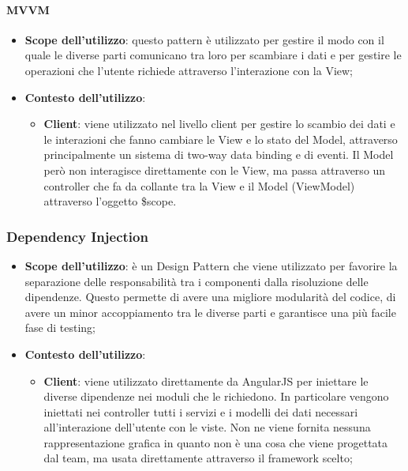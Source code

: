 		\paragraph{MVVM} %
		\label{par:mvvm}
			\begin{itemize}
				\item \textbf{Scope dell'utilizzo}: questo pattern è utilizzato per gestire il modo con il quale le diverse parti comunicano tra loro per scambiare i dati e per gestire le operazioni che l'utente richiede attraverso l'interazione con la View;

				\item \textbf{Contesto dell'utilizzo}: 
					\begin{itemize}
						\item \textbf{Client}: viene utilizzato nel livello client per gestire lo scambio dei dati e le interazioni che fanno cambiare le View e lo stato del Model, attraverso principalmente un sistema di two-way data binding e di eventi. Il Model però non interagisce direttamente con le View, ma passa attraverso un controller che fa da collante tra la View e il Model (ViewModel) attraverso l'oggetto \$scope.
					\end{itemize}
			\end{itemize}

	\subsubsection{Dependency Injection} %
	\label{ssub:dependency_injection}
		\begin{itemize}
			\item \textbf{Scope dell'utilizzo}: è un Design Pattern che viene utilizzato per favorire la separazione delle responsabilità tra i componenti dalla risoluzione delle dipendenze. Questo permette di avere una migliore modularità del codice, di avere un minor accoppiamento tra le diverse parti e garantisce una più facile fase di testing;
			\item \textbf{Contesto dell'utilizzo}: 
				\begin{itemize}
					\item \textbf{Client}: viene utilizzato direttamente da AngularJS per iniettare le diverse dipendenze nei moduli che le richiedono. In particolare vengono iniettati nei controller tutti i servizi e i modelli dei dati necessari all'interazione dell'utente con le viste. \newline
					Non ne viene fornita nessuna rappresentazione grafica in quanto non è una cosa che viene progettata dal team, ma usata direttamente attraverso il framework scelto;
				\end{itemize}
		\end{itemize}


